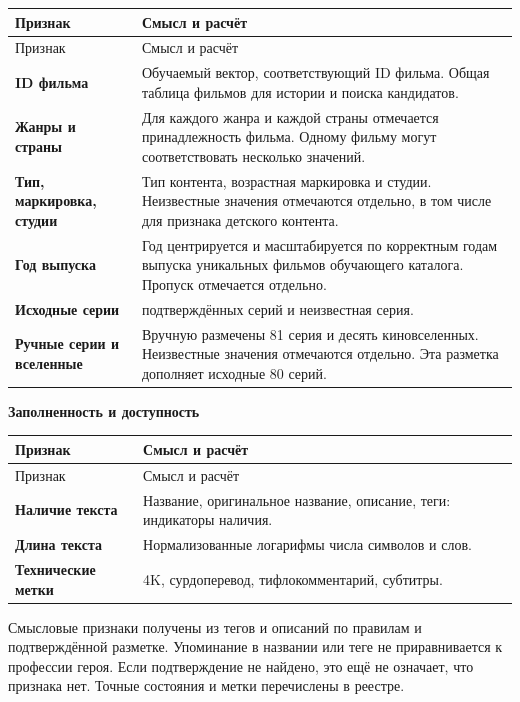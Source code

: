 \documentclass[11pt,a4paper]{article}
\begin{document}
\begin{longtable}{>{\raggedright\arraybackslash}p{4.1cm}>{\raggedright\arraybackslash}p{10.8cm}}
\toprule
Признак & Смысл и расчёт \\
\midrule
\endfirsthead
\toprule
Признак & Смысл и расчёт \\
\midrule
\endhead
\textbf{ID фильма} & Обучаемый вектор, соответствующий ID фильма. Общая таблица фильмов для истории и поиска кандидатов. \\[4pt]
\textbf{Жанры и страны} & Для каждого жанра и каждой страны отмечается принадлежность фильма. Одному фильму могут соответствовать несколько значений. \\[4pt]
\textbf{Тип, маркировка, студии} & Тип контента, возрастная маркировка и студии. Неизвестные значения отмечаются отдельно, в том числе для признака детского контента. \\[4pt]
\textbf{Год выпуска} & Год центрируется и масштабируется по корректным годам выпуска уникальных фильмов обучающего каталога. Пропуск отмечается отдельно. \\[4pt]
\textbf{Исходные серии} & 80 подтверждённых серий и неизвестная серия. \\[4pt]
\textbf{Ручные серии и вселенные} & Вручную размечены 81 серия и десять киновселенных. Неизвестные значения отмечаются отдельно. Эта разметка дополняет исходные 80 серий. \\[4pt]
\bottomrule
\end{longtable}

\textbf{Заполненность и доступность}


\begin{longtable}{>{\raggedright\arraybackslash}p{4.1cm}>{\raggedright\arraybackslash}p{10.8cm}}
\toprule
Признак & Смысл и расчёт \\
\midrule
\endfirsthead
\toprule
Признак & Смысл и расчёт \\
\midrule
\endhead
\textbf{Наличие текста} & Название, оригинальное название, описание, теги: индикаторы наличия. \\[4pt]
\textbf{Длина текста} & Нормализованные логарифмы числа символов и слов. \\[4pt]
\textbf{Технические метки} & 4K, сурдоперевод, тифлокомментарий, субтитры. \\[4pt]
\bottomrule
\end{longtable}

\newpage

Смысловые признаки получены из тегов и описаний по правилам и подтверждённой разметке. Упоминание в названии или теге не приравнивается к профессии героя. Если подтверждение не найдено, это ещё не означает, что признака нет. Точные состояния и метки перечислены в реестре.
\end{document}
